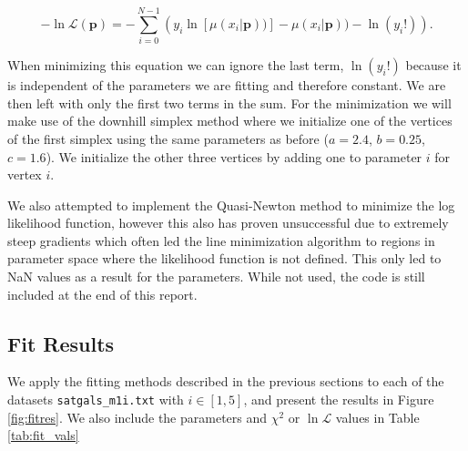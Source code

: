 \begin{equation}
    -\ln \mathcal{L}(\boldsymbol{p}) = -\sum_{i=0}^{N-1} \left(y_i\ln\left[\mu(x_i | \boldsymbol{p}))\right] - \mu(x_i | \boldsymbol{p})) - \ln(y_i!)\right).\label{eq:logL}
\end{equation}

When minimizing this equation we can ignore the last term, $\ln(y_i!)$ because it is independent of the parameters we are fitting and therefore constant. We are then left with only the first two terms in the sum. For the minimization we will make use of the downhill simplex method where we initialize one of the vertices of the first simplex using the same parameters as before ($a=2.4$, $b=0.25$, $c=1.6$). We initialize the other three vertices by adding one to parameter $i$ for vertex $i$.

We also attempted to implement the Quasi-Newton method to minimize the log likelihood function, however this also has proven unsuccessful due to extremely steep gradients which often led the line minimization algorithm to regions in parameter space where the likelihood function is not defined. This only led to NaN values as a result for the parameters. While not used, the code is still included at the end of this report.




\subsection{Fit Results}\label{sec:fitresults}

We apply the fitting methods described in the previous sections to each of the datasets \texttt{satgals\_m1i.txt} with $i \in [1,5]$, and present the results in Figure \ref{fig:fitres}. We also include the parameters and $\chi^2$ or $\ln\mathcal{L}$ values in Table \ref{tab:fit_vals}

